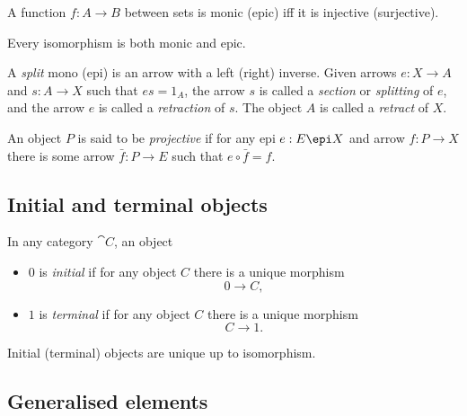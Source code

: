 \documentclass{article}
\begin{document}
\begin{proposition}[Awodey 2.2]
    A function $f:A\to B$ between sets is monic (epic) iff it is injective (surjective).
\end{proposition}

\begin{proposition}[Awodey 2.6]
    Every isomorphism is both monic and epic.
\end{proposition}

\begin{definition}[Awodey 2.7]
    A \emph{split} mono (epi) is an arrow with a left (right) inverse. Given
    arrows $e:X\to A$ and $s:A\to X$ such that $es=1_A$, the arrow $s$ is called
    a \emph{section} or \emph{splitting} of $e$, and the arrow $e$ is called a
    \emph{retraction} of $s$. The object $A$ is called a \emph{retract} of $X$.
\end{definition}

\begin{definition}
    An object $P$ is said to be \emph{projective} if for any epi $e:E\epi X$
    and arrow $f:P\to X$ there is some arrow $\bar f:P\to E$ such that
    $e\circ \bar f = f$.
\end{definition}

\subsection{Initial and terminal objects}

\begin{definition}[Awodey 2.9]
    In any category $\cat C$, an object
    \begin{itemize}
        \item $0$ is \emph{initial} if for any object $C$ there is a unique morphism
        \[0\to C,\]
        \item $1$ is \emph{terminal} if for any object $C$ there is a unique morphism
        \[C\to 1.\]
    \end{itemize}
\end{definition}

\begin{proposition}[Awodey 2.10]
    Initial (terminal) objects are unique up to isomorphism.    
\end{proposition}

\subsection{Generalised elements}
\end{document}
